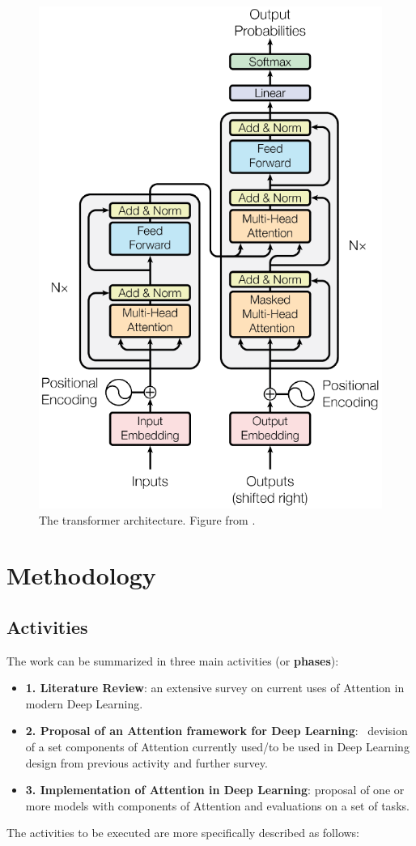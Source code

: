 \documentclass[English]{style/ic-tese-v3}
\begin{document}
\begin{figure}
\begin{center}
    \includegraphics[width=0.4\linewidth]{./img/transformer.png}
\caption{
    The transformer architecture.
    Figure from \cite{ref:transformer}.
}
\label{fig:transformer}
\end{center}
\end{figure}

\let\clearpage\relax
\newpage

\chapter{Methodology}
\section{Activities}
The work can be summarized in three main activities (or \textbf{phases}):
\begin{itemize}
    \item \textbf{1. Literature Review}: an extensive survey on current uses of Attention in modern
        Deep Learning.
    \item \textbf{2. Proposal of an Attention framework for Deep Learning}: \
        devision of a set components of Attention currently used/to be used in Deep Learning design
        from previous activity and further survey.
    \item \textbf{3. Implementation of Attention in Deep Learning}:
        proposal of one or more models with components of Attention and evaluations on a set of tasks.
\end{itemize}

The activities to be executed are more specifically described as follows:
\end{document}
